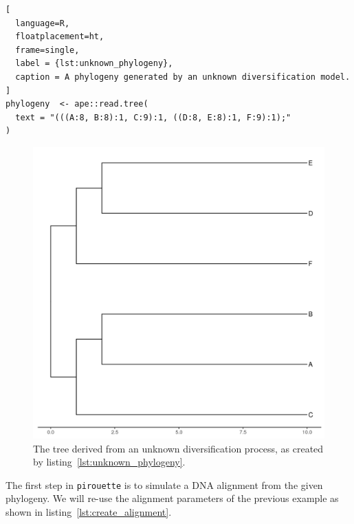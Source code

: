 \documentclass{article}
\begin{document}
\begin{lstlisting}[
  language=R, 
  floatplacement=ht, 
  frame=single, 
  label = {lst:unknown_phylogeny},
  caption = A phylogeny generated by an unknown diversification model.
]
phylogeny  <- ape::read.tree(
  text = "(((A:8, B:8):1, C:9):1, ((D:8, E:8):1, F:9):1);"
)
\end{lstlisting}
\begin{figure}[ht]
  \includegraphics[width=\textwidth]{tree_unknown.png}
  \caption{The tree derived from an unknown diversification process, 
    as created by listing~\ref{lst:unknown_phylogeny}.
  }
\end{figure}

The first step in \verb;pirouette; is to simulate a DNA alignment from the given phylogeny. 
We will re-use the alignment parameters of the previous example 
as shown in listing~\ref{lst:create_alignment}.
\end{document}
